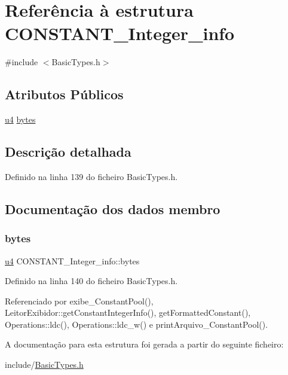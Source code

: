 \hypertarget{structCONSTANT__Integer__info}{}\section{Referência à estrutura C\+O\+N\+S\+T\+A\+N\+T\+\_\+\+Integer\+\_\+info}
\label{structCONSTANT__Integer__info}


{\ttfamily \#include $<$Basic\+Types.\+h$>$}

\subsection*{Atributos Públicos}
\begin{DoxyCompactItemize}
\item 
\hyperlink{BasicTypes_8h_ae5be1f726785414dd1b77d60df074c9d}{u4} \hyperlink{structCONSTANT__Integer__info_a96773e0cf436f4a55e404adf9bcb2c36}{bytes}
\end{DoxyCompactItemize}


\subsection{Descrição detalhada}


Definido na linha 139 do ficheiro Basic\+Types.\+h.



\subsection{Documentação dos dados membro}
\mbox{\label{structCONSTANT__Integer__info_a96773e0cf436f4a55e404adf9bcb2c36}} 
\subsubsection{\texorpdfstring{bytes}{bytes}}
{\footnotesize\ttfamily \hyperlink{BasicTypes_8h_ae5be1f726785414dd1b77d60df074c9d}{u4} C\+O\+N\+S\+T\+A\+N\+T\+\_\+\+Integer\+\_\+info\+::bytes}



Definido na linha 140 do ficheiro Basic\+Types.\+h.



Referenciado por exibe\+\_\+\+Constant\+Pool(), Leitor\+Exibidor\+::get\+Constant\+Integer\+Info(), get\+Formatted\+Constant(), Operations\+::ldc(), Operations\+::ldc\+\_\+w() e print\+Arquivo\+\_\+\+Constant\+Pool().



A documentação para esta estrutura foi gerada a partir do seguinte ficheiro\+:\begin{DoxyCompactItemize}
\item 
include/\hyperlink{BasicTypes_8h}{Basic\+Types.\+h}\end{DoxyCompactItemize}

